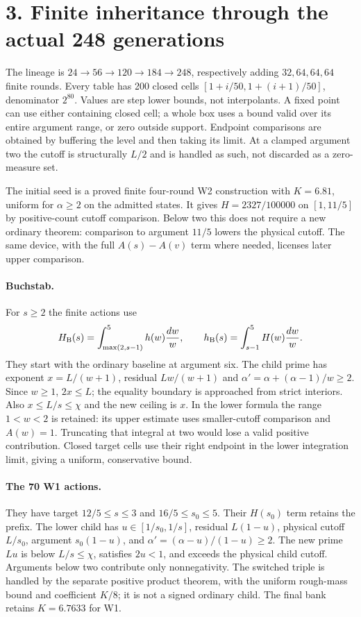 \documentclass[11pt]{article}
\begin{document}
\section*{3. Finite inheritance through the actual 248 generations}
The lineage is $24\to56\to120\to184\to248$, respectively adding
$32,64,64,64$ finite rounds. Every table has 200 closed cells
$[1+i/50,1+(i+1)/50]$, denominator $2^{80}$. Values are step lower
bounds, not interpolants. A fixed point can use either containing
closed cell; a whole box uses a bound valid over its entire argument
range, or zero outside support. Endpoint comparisons are obtained by
buffering the level and then taking its limit. At a clamped argument
two the cutoff is structurally $L/2$ and is handled as such, not
discarded as a zero-measure set.

The initial seed is a proved finite four-round W2 construction with
$K=6.81$, uniform for $\alpha\ge2$ on the admitted states. It gives
$H=2327/100000$ on $[1,11/5]$ by positive-count cutoff comparison.
Below two this does not require a new ordinary theorem: comparison
to argument $11/5$ lowers the physical cutoff. The same device, with
the full $A(s)-A(v)$ term where needed, licenses later upper comparison.

\paragraph{Buchstab.}
For $s\ge2$ the finite actions use
\[
 H_{\rm B}(s)=\int_{\max(2,s-1)}^5h(w){dw\over w},\qquad
 h_{\rm B}(s)=\int_{s-1}^5H(w){dw\over w}.
\]
They start with the ordinary baseline at argument six. The child prime
has exponent $x=L/(w+1)$, residual $Lw/(w+1)$ and
$\alpha'=\alpha+(\alpha-1)/w\ge2$. Since $w\ge1$, $2x\le L$;
the equality boundary is approached from strict interiors. Also
$x\le L/s\le\chi$ and the new ceiling is $x$. In the lower formula
the range $1<w<2$ is retained: its upper estimate uses smaller-cutoff
comparison and $A(w)=1$. Truncating that integral at two would lose a
valid positive contribution. Closed target cells use their right endpoint
in the lower integration limit, giving a uniform, conservative bound.

\paragraph{The 70 W1 actions.}
They have target $12/5\le s\le3$ and $16/5\le s_0\le5$.
Their $H(s_0)$ term retains the prefix. The lower child has
$u\in[1/s_0,1/s]$, residual $L(1-u)$, physical cutoff $L/s_0$,
argument $s_0(1-u)$, and
$\alpha'=(\alpha-u)/(1-u)\ge2$. The new prime $Lu$ is below
$L/s\le\chi$, satisfies $2u<1$, and exceeds the physical child
cutoff. Arguments below two contribute only nonnegativity. The switched
triple is handled by the separate positive product theorem, with the
uniform rough-mass bound and coefficient $K/8$; it is not a signed
ordinary child. The final bank retains $K=6.7633$ for W1.
\end{document}
